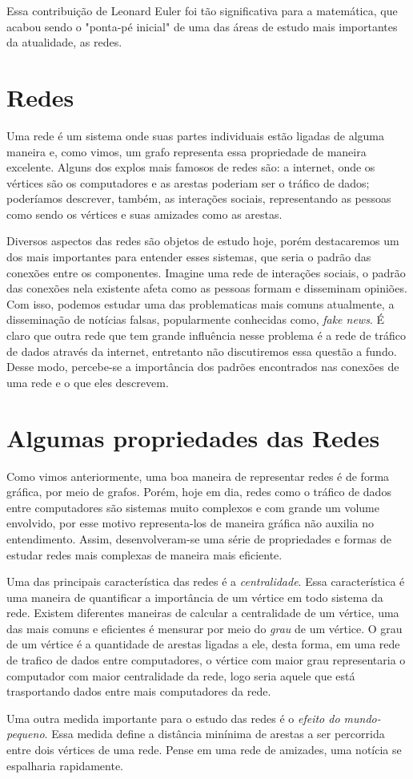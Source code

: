 \documentclass{article}
\begin{document}
Essa contribuição de Leonard Euler foi tão significativa para a matemática, que acabou sendo o "ponta-pé inicial" de uma das áreas de estudo mais importantes da atualidade, as redes.

\section{Redes}

Uma rede é um sistema onde suas partes individuais estão ligadas de alguma maneira e, como vimos, um grafo representa essa propriedade de maneira excelente. Alguns dos explos mais famosos de redes são: a internet, onde os vértices são os computadores e as arestas poderiam ser o tráfico de dados; poderíamos descrever, também, as interações sociais, representando as pessoas como sendo os vértices e suas amizades como as arestas.



Diversos aspectos das redes são objetos de estudo hoje, porém destacaremos um dos mais importantes para entender esses sistemas, que seria o padrão das conexões entre os componentes. Imagine uma rede de interações sociais, o padrão das conexões nela existente afeta como as pessoas formam e disseminam opiniões. Com isso, podemos estudar uma das problematicas mais comuns atualmente, a disseminação de notícias falsas, popularmente conhecidas como,  \textit{fake news}. É claro que outra rede que tem grande influência nesse problema é a rede de tráfico de dados através da internet, entretanto não discutiremos essa questão a fundo. Desse modo, percebe-se a importância dos padrões encontrados nas conexões de uma rede e o que eles descrevem.
 
\section{Algumas propriedades das Redes}

Como vimos anteriormente, uma boa maneira de representar redes é de forma gráfica, por meio de grafos. Porém, hoje em dia, redes como o tráfico de dados entre computadores são sistemas muito complexos e com grande um volume envolvido, por esse motivo representa-los de maneira gráfica não auxilia no entendimento. Assim, desenvolveram-se uma série de propriedades e formas de estudar redes mais complexas de maneira mais eficiente.


Uma das principais característica das redes é a \textit{centralidade}. Essa característica é uma maneira de quantificar a importância de um vértice em todo sistema da rede. Existem diferentes maneiras de calcular a centralidade de um vértice, uma das mais comuns e eficientes é mensurar por meio do \textit{grau} de um vértice. O grau de um vértice é a quantidade de arestas ligadas a ele, desta forma, em uma rede de trafico de dados entre computadores, o vértice com maior grau representaria o computador com maior centralidade da rede, logo seria aquele que está trasportando dados entre mais computadores da rede.


Uma outra medida importante para o estudo das redes é o \textit{efeito do mundo-pequeno}. Essa medida define a distância minínima de arestas a ser percorrida entre dois vértices de uma rede. Pense em uma rede de amizades, uma notícia se espalharia rapidamente.
\end{document}
